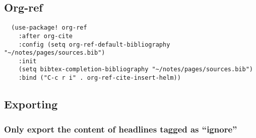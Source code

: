 \documentclass[11pt]{article}
\begin{document}
\subsection{Org-ref}
\label{sec:orga20fecf}
\begin{verbatim}
  (use-package! org-ref
    :after org-cite
    :config (setq org-ref-default-bibliography "~/notes/pages/sources.bib")
    :init
    (setq bibtex-completion-bibliography "~/notes/pages/sources.bib")
    :bind ("C-c r i" . org-ref-cite-insert-helm))
\end{verbatim}

\subsection{Exporting}
\label{sec:org7a071aa}

\subsubsection{Only export the content of headlines tagged as ``ignore''}
\label{sec:org2c873ac}
\end{document}
